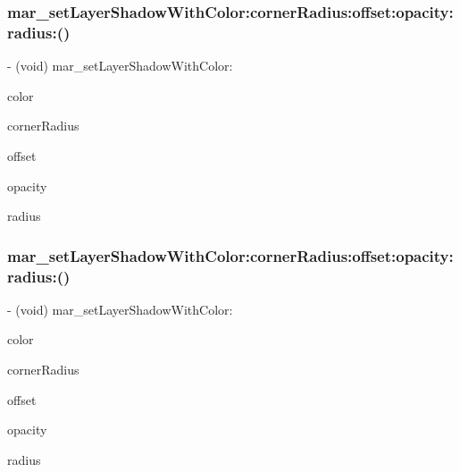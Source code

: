 \subsubsection{\texorpdfstring{mar\+\_\+set\+Layer\+Shadow\+With\+Color\+:corner\+Radius\+:offset\+:opacity\+:radius\+:()}{mar\_setLayerShadowWithColor:cornerRadius:offset:opacity:radius:()}\hspace{0.1cm}{\footnotesize\ttfamily [1/2]}}
{\footnotesize\ttfamily -\/ (void) mar\+\_\+set\+Layer\+Shadow\+With\+Color\+: \begin{DoxyParamCaption}\item[{(U\+I\+Color $\ast$)}]{color }\item[{cornerRadius:(C\+G\+Float)}]{corner\+Radius }\item[{offset:(C\+G\+Size)}]{offset }\item[{opacity:(C\+G\+Float)}]{opacity }\item[{radius:(C\+G\+Float)}]{radius }\end{DoxyParamCaption}\hspace{0.3cm}{\ttfamily [implementation]}}

\mbox{\label{category_u_i_view_07_m_a_r_e_x_08_a4e36de0f3f06b56b62e8b27aca687fa6}} 
\subsubsection{\texorpdfstring{mar\+\_\+set\+Layer\+Shadow\+With\+Color\+:corner\+Radius\+:offset\+:opacity\+:radius\+:()}{mar\_setLayerShadowWithColor:cornerRadius:offset:opacity:radius:()}\hspace{0.1cm}{\footnotesize\ttfamily [2/2]}}
{\footnotesize\ttfamily -\/ (void) mar\+\_\+set\+Layer\+Shadow\+With\+Color\+: \begin{DoxyParamCaption}\item[{(nullable U\+I\+Color $\ast$)}]{color }\item[{cornerRadius:(C\+G\+Float)}]{corner\+Radius }\item[{offset:(C\+G\+Size)}]{offset }\item[{opacity:(C\+G\+Float)}]{opacity }\item[{radius:(C\+G\+Float)}]{radius }\end{DoxyParamCaption}}

